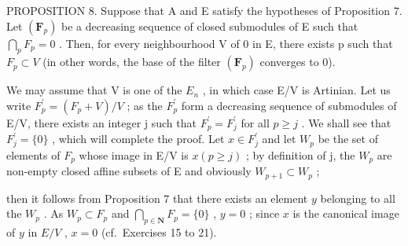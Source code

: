 PROPOSITION 8. Suppose that A and E satisfy the hypotheses of Proposition 7. Let \((\mathbf{F}_{p})\) be a decreasing sequence of closed submodules of E such that \(\bigcap_{p} F_{p} = 0\) . Then, for every neighbourhood V of 0 in E, there exists p such that \(F_{p} \subset V\) (in other words, the base of the filter \((\mathbf{F}_{p})\) converges to 0).

We may assume that V is one of the \(E_{n}\) , in which case E/V is Artinian. Let us write \(F_{p}^{\prime} = (F_{p} + V)/V\) ; as the \(F_{p}^{\prime}\) form a decreasing sequence of submodules of E/V, there exists an integer j such that \(F_{p}^{\prime} = F_{j}^{\prime}\) for all \(p \geqslant j\) . We shall see that \(F_{j}^{\prime} = \{0\}\) , which will complete the proof. Let \(x \in F_{j}^{\prime}\) and let \(W_{p}\) be the set of elements of \(F_{p}\) whose image in E/V is \(x (p \geqslant j)\) ; by definition of j, the \(W_{p}\) are non-empty closed affine subsets of E and obviously \(W_{p+1} \subset W_{p}\) ;

then it follows from Proposition 7 that there exists an element \(y\) belonging to all the \(W_p\) . As \(W_p \subset F_p\) and \(\bigcap_{p \in \mathbf{N}} F_p = \{0\}\) , \(y = 0\) ; since \(x\) is the canonical image of \(y\) in \(E / V\) , \(x = 0\) (cf.~Exercises 15 to 21).

